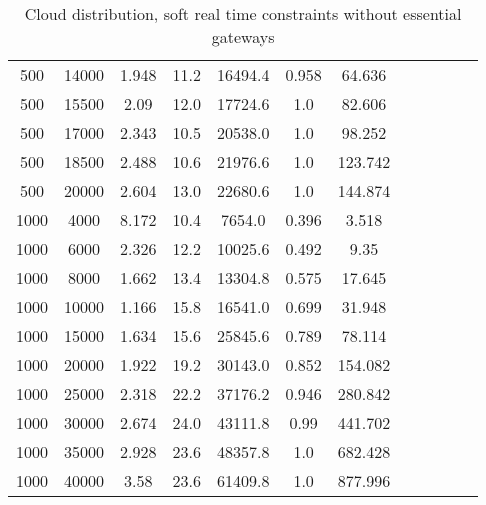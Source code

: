 \begin{table}[htb]
\begin{tabular}{|c|c|c|c|c|c|c|c|c|c|c|c|}
		500 & 14000 & 1.948 & 11.2 & 16494.4 & 0.958 & 64.636 & & & & &  \\ 
		500 & 15500 & 2.09 & 12.0 & 17724.6 & 1.0 & 82.606 & & & & &  \\ 
		500 & 17000 & 2.343 & 10.5 & 20538.0 & 1.0 & 98.252 & & & & &  \\ 
		500 & 18500 & 2.488 & 10.6 & 21976.6 & 1.0 & 123.742 & & & & &  \\ 
		500 & 20000 & 2.604 & 13.0 & 22680.6 & 1.0 & 144.874 & & & & &  \\ 
		1000 & 4000 & 8.172 & 10.4 & 7654.0 & 0.396 & 3.518 & & & & &  \\ 
		1000 & 6000 & 2.326 & 12.2 & 10025.6 & 0.492 & 9.35 & & & & &  \\ 
		1000 & 8000 & 1.662 & 13.4 & 13304.8 & 0.575 & 17.645 & & & & &  \\ 
		1000 & 10000 & 1.166 & 15.8 & 16541.0 & 0.699 & 31.948 & & & & &  \\ 
		1000 & 15000 & 1.634 & 15.6 & 25845.6 & 0.789 & 78.114 & & & & &  \\ 
		1000 & 20000 & 1.922 & 19.2 & 30143.0 & 0.852 & 154.082 & & & & &  \\ 
		1000 & 25000 & 2.318 & 22.2 & 37176.2 & 0.946 & 280.842 & & & & &  \\ 
		1000 & 30000 & 2.674 & 24.0 & 43111.8 & 0.99 & 441.702 & & & & &  \\ 
		1000 & 35000 & 2.928 & 23.6 & 48357.8 & 1.0 & 682.428 & & & & &  \\ 
		1000 & 40000 & 3.58 & 23.6 & 61409.8 & 1.0 & 877.996 & & & & &  \\ 
		\hline 
	\end{tabular} 
	\caption{Cloud distribution, soft real time constraints without essential gateways} 
	\label{tab:cloud_soft_n_esc} 
\end{table} 

